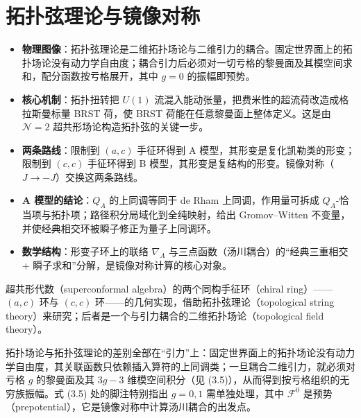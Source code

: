 

\section{拓扑弦理论与镜像对称}
\label{sec:3}

\begin{keytakeaways}
  \begin{itemize}[leftmargin=1.4em,itemsep=2pt,topsep=2pt]
    \item \textbf{物理图像}：拓扑弦理论是二维拓扑场论与二维引力的耦合。固定世界面上的拓扑场论没有动力学自由度；耦合引力后必须对一切亏格的黎曼面及其模空间求和，配分函数按亏格展开，其中 $g=0$ 的振幅即预势。
    \item \textbf{核心机制}：拓扑扭转把 $U(1)$ 流混入能动张量，把费米性的超流荷改造成格拉斯曼标量 BRST 荷，使 BRST 荷能在任意黎曼面上整体定义。这是由 $\mathcal{N}=2$ 超共形场论构造拓扑弦的关键一步。
    \item \textbf{两条路线}：限制到 $(a,c)$ 手征环得到 A 模型，其形变是复化凯勒类的形变；限制到 $(c,c)$ 手征环得到 B 模型，其形变是复结构的形变。镜像对称（$J\to-J$）交换这两条路线。
    \item \textbf{A 模型的结论}：$Q_A$ 的上同调等同于 de Rham 上同调，作用量可拆成 $Q_A$-恰当项与拓扑项；路径积分局域化到全纯映射，给出 Gromov--Witten 不变量，并使经典相交环被瞬子修正为量子上同调环。
    \item \textbf{数学结构}：形变子环上的联络 $\nabla_A$ 与三点函数（汤川耦合）的“经典三重相交 + 瞬子求和”分解，是镜像对称计算的核心对象。
  \end{itemize}
\end{keytakeaways}

超共形代数（superconformal algebra）的两个同构手征环（chiral ring）——$(a,c)$ 环与 $(c,c)$ 环——的几何实现，借助拓扑弦理论（topological string theory）来研究；后者是一个与引力耦合的二维拓扑场论（topological field theory）。

\begin{yizhu}[物理图像]
拓扑场论与拓扑弦理论的差别全部在“引力”上：固定世界面上的拓扑场论没有动力学自由度，其关联函数只依赖插入算符的上同调类；一旦耦合二维引力，就必须对亏格 $g$ 的黎曼面及其 $3g-3$ 维模空间积分（见 (3.5)），从而得到按亏格组织的无穷族振幅。式 (3.5) 处的脚注特别指出 $g=0,1$ 需单独处理，其中 $\mathcal{F}^0$ 是预势（prepotential），它是镜像对称中计算汤川耦合的出发点。
\end{yizhu}


